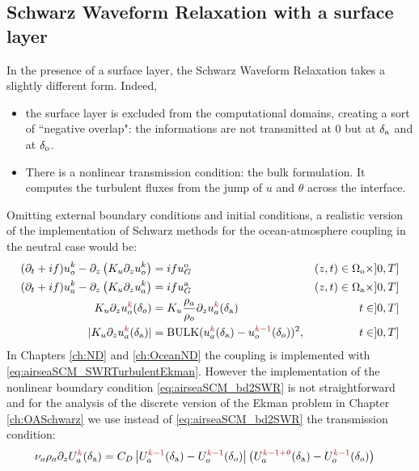 \subsection{Schwarz Waveform Relaxation with a surface layer}
In the presence of a surface layer, the Schwarz Waveform Relaxation
takes a slightly different form.
Indeed, 
\begin{itemize}
\item the surface layer is excluded from the computational domains,
creating a sort of ``negative overlap": the informations are
not transmitted at 0 but at $\delta_{\rm a}$ and at $\delta_{\rm o}$.
\item There is a nonlinear transmission condition: the bulk
formulation. It computes the turbulent fluxes from the jump of
$u$ and $\theta$ across the interface.
\end{itemize}
\par
Omitting external boundary conditions and initial conditions,
a realistic version of the implementation of Schwarz methods for
the ocean-atmosphere coupling in the neutral case would be:
\begin{subequations}
\begin{align}
(\partial_t+if) u_o^k - \partial_z \left(K_u \partial_z u_o^k\right)
	&= if u_G^{\rm o}  & (z,t) \in \Omega_{\rm o} \times ]0,T] \label{eq:airseaSCM_dr1_final} \\
(\partial_t+if) u_a^k - \partial_z \left(K_u \partial_z u_a^k\right)
	&= if u_G^{\rm a}  & (z,t) \in \Omega_{\rm a} \times ]0,T] \label{eq:airseaSCM_dr2_final} \\
	K_u \partial_z u_o^{\emphase{k}}(\delta_o) &=
	K_u \frac{\rho_a}{\rho_o} \partial_z u_a^{\emphase{k}}(\delta_{\rm a})
	& t \in ]0,T] \label{eq:airseaSCM_bd1} \\
	|K_u \partial_z u_a^{\emphase{k}}(\delta_{\rm a})|
	&= {\rm BULK}(u_a^{\emphase{k}}(\delta_{\rm a})
	-u_o^{\emphase{k-1}}(\delta_o))^2,
	& t \in ]0,T]\label{eq:airseaSCM_bd2SWR}
\end{align}
\label{eq:airseaSCM_SWRTurbulentEkman}
\end{subequations}
In Chapters \ref{ch:ND} and \ref{ch:OceanND} the coupling is
implemented with \eqref{eq:airseaSCM_SWRTurbulentEkman}.
However the implementation of the nonlinear boundary condition
\eqref{eq:airseaSCM_bd2SWR} is not straightforward and for the
analysis of the discrete version of the Ekman problem in Chapter
\ref{ch:OASchwarz} we use instead of \eqref{eq:airseaSCM_bd2SWR}
the transmission condition:
\begin{equation}
	\label{eq:airseaSCM_simplifiedBdCondForOASchwarz}
	\begin{aligned}
		\nu_a \rho_a \partial_z U_a^{\emphase{k}}(\delta_{\rm a})
		&= C_D \left|U_a^{\emphase{{k-1}}}(\delta_{\rm a})
		-U_o^{\emphase{k-1}}(\delta_o)\right|\left(U_a^{\emphase{{k-1+\theta}}}
		(\delta_{\rm a}) -U_o^{\emphase{k-1}}(\delta_o)\right)
	\end{aligned}
\end{equation}
